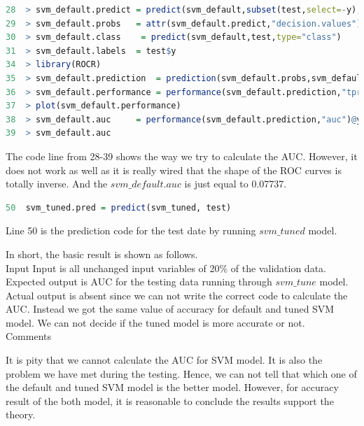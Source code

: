 \documentclass[12pt, a4paper, bibliography=totoc, english]{scrartcl}
\begin{document}
\begin{lstlisting}[language = R]
28  > svm_default.predict = predict(svm_default,subset(test,select=-y),decision.values=TRUE)
29  > svm_default.probs   = attr(svm_default.predict,"decision.values")
30  > svm_default.class    = predict(svm_default,test,type="class")
31  > svm_default.labels  = test$y
34  > library(ROCR)
35  > svm_default.prediction  = prediction(svm_default.probs,svm_default.labels)
36  > svm_default.performance = performance(svm_default.prediction,"tpr","fpr")
37  > plot(svm_default.performance)
38  > svm_default.auc     = performance(svm_default.prediction,"auc")@y.values[[1]]
39  > svm_default.auc
\end{lstlisting}
The code line from 28-39 shows the way we try to calculate the AUC. However, it does not work as well as it is really wired that the shape of the ROC curves is totally inverse. And the $svm\_default.auc$ is just equal to 0.07737.\\

\begin{lstlisting}[language = R]
50  svm_tuned.pred = predict(svm_tuned, test) 
\end{lstlisting}
Line 50 is the prediction code for the test date by running $svm\_tuned$ model.

In short, the basic result is shown as follows.\\
\textbullet\quad Input Input is all unchanged input variables of 20\% of the validation data.\\
\textbullet\quad Expected output is AUC for the testing data running through $svm\_tune$ model.\\
\textbullet\quad Actual output is absent since we can not write the correct code to calculate the AUC. Instead we got the same value of accuracy for default and tuned SVM model. We can not decide if the tuned model is more accurate or not. \\
\textbullet\quad Comments 

It is pity that we cannot calculate the AUC for SVM model. It is also the problem we have met during the testing. Hence, we can not tell that which one of the default and tuned SVM model is the better model. However, for accuracy result of the both model, it is reasonable to conclude the results support the theory.  
\end{document}
